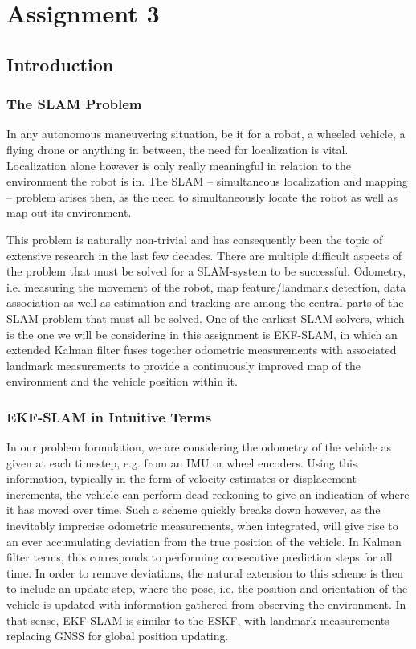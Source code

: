 \section{Assignment 3}
\subsection{Introduction}
\subsubsection{The SLAM Problem}
In any autonomous maneuvering situation, be it for a robot, a wheeled vehicle, a flying drone or anything in between, the need for localization is vital.
Localization alone however is only really meaningful in relation to the environment the robot is in.
The SLAM – simultaneous localization and mapping – problem arises then, as the need to simultaneously locate the robot as well as map out its environment.

This problem is naturally non-trivial and has consequently been the topic of extensive research in the last few decades.
There are multiple difficult aspects of the problem that must be solved for a SLAM-system to be successful.
Odometry, i.e. measuring the movement of the robot, map feature/landmark detection, data association as well as estimation and tracking are among the central parts of the SLAM problem that must all be solved.
One of the earliest SLAM solvers, which is the one we will be considering in this assignment is EKF-SLAM, in which an extended Kalman filter fuses together odometric measurements with associated landmark measurements to provide a continuously improved map of the environment and the vehicle position within it.

\subsubsection{EKF-SLAM in Intuitive Terms}
In our problem formulation, we are considering the odometry of the vehicle as given at each timestep, e.g. from an IMU or wheel encoders.
Using this information, typically in the form of velocity estimates or displacement increments, the vehicle can perform dead reckoning to give an indication of where it has moved over time.
Such a scheme quickly breaks down however, as the inevitably imprecise odometric measurements, when integrated, will give rise to an ever accumulating deviation from the true position of the vehicle. In Kalman filter terms, this corresponds to performing consecutive prediction steps for all time. In order to remove deviations, the natural extension to this scheme is then to include an update step, where the pose, i.e. the position and orientation of the vehicle is updated with information gathered from observing the environment. In that sense, EKF-SLAM is similar to the ESKF, with landmark measurements replacing GNSS for global position updating.

